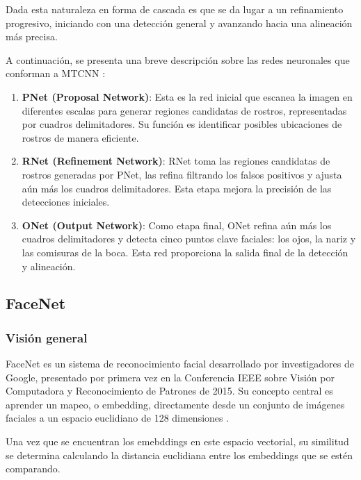 Dada esta naturaleza en forma de cascada es que se da lugar a un refinamiento progresivo, iniciando con una detección general y avanzando hacia una alineación más precisa.

A continuación, se presenta una breve descripción sobre las redes neuronales que conforman a MTCNN \cite{MTCNN_Paper}:

\begin{enumerate}
	
	
	\item \textbf{PNet (Proposal Network)}:  Esta es la red inicial que escanea la imagen en diferentes escalas para generar regiones candidatas de rostros, representadas por cuadros delimitadores. Su función es identificar posibles ubicaciones de rostros de manera eficiente.
	
	\item \textbf{RNet (Refinement Network)}: RNet toma las regiones candidatas de rostros generadas por PNet, las refina filtrando los falsos positivos y ajusta aún más los cuadros delimitadores. Esta etapa mejora la precisión de las detecciones iniciales.
	
	\item \textbf{ONet (Output Network)}: Como etapa final, ONet refina aún más los cuadros delimitadores y detecta cinco puntos clave faciales: los ojos, la nariz y las comisuras de la boca. Esta red proporciona la salida final de la detección y alineación. 
	
\end{enumerate}


\subsection{FaceNet}

\subsubsection{Visión general}

FaceNet es un sistema de reconocimiento facial desarrollado por investigadores de Google, presentado por primera vez en la Conferencia IEEE sobre Visión por Computadora y Reconocimiento de Patrones de 2015. Su concepto central es aprender un mapeo, o embedding, directamente desde un conjunto de imágenes faciales a un espacio euclidiano de 128 dimensiones \cite{FaceNet_Paper}.

Una vez que se encuentran los emebddings en este espacio vectorial, su similitud se determina calculando la distancia euclidiana entre los embeddings que se estén comparando.


